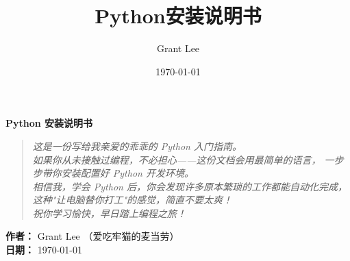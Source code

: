 \documentclass[a4paper,12pt]{ctexart}%
\title{Python安装说明书}
\author{Grant Lee}
\date{\today}
\begin{document}
\begin{titlepage}
    \centering
    \vspace*{3cm}
    
    {\Huge\bfseries Python 安装说明书\par}
    
    \vspace{3cm}
    
    {\large
    \begin{quotation}
        \textit{
        这是一份写给我亲爱的乖乖的 Python 入门指南。\\[1em]
        如果你从未接触过编程，不必担心——这份文档会用最简单的语言，
        一步步带你安装配置好 Python 开发环境。\\[1em]
        相信我，学会 Python 后，你会发现许多原本繁琐的工作都能自动化完成，
        这种"让电脑替你打工"的感觉，简直不要太爽！\\[1em]
        祝你学习愉快，早日踏上编程之旅！
        }
    \end{quotation}
    }
    
    \vfill
    
    {\large
    \textbf{作者：} Grant Lee （爱吃牢猫的麦当劳）\\[0.5em]
    \textbf{日期：} \today
    }
    
    \vspace{1cm}
\end{titlepage}

\newpage%
\tableofcontents
\newpage%









%

%



\end{document}
